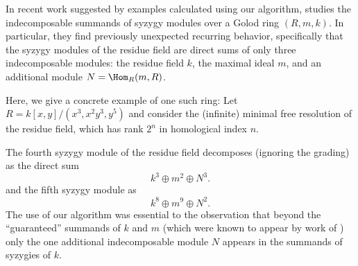 \documentclass[12pt]{article}
\numberwithin{equation}{section}
\theoremstyle{theorem}
\numberwithin{thm}{section}
\theoremstyle{definition}
\newcommand{\mahrud}[1]{{\color{ForestGreen} \sf $\blacklozenge$ Mahrud: [#1]}}
\begin{document}

\begin{exa}
  In recent work suggested by examples calculated using our algorithm, \cite{CDE24} studies the indecomposable summands of syzygy modules over a Golod ring $(R,m,k)$. In particular, they find previously unexpected recurring behavior, specifically that the syzygy modules of the residue field are direct sums of only three indecomposable modules: the residue field $k$, the maximal ideal $m$, and an additional module $N = \Hom_R(m, R)$.

  Here, we give a concrete example of one such ring:
  Let $R = k[x,y]/(x^3,x^2y^3,y^5)$ and consider the (infinite) minimal free resolution of the residue field, which has rank $2^n$ in homological index $n$.

  The fourth syzygy module of the residue field decomposes (ignoring the grading) as the direct sum
  $$ k^3 \oplus m^2 \oplus N^3. $$
  and the fifth syzygy module as
  $$ k^8\oplus m^9 \oplus N^2. $$
  The use of our algorithm was essential to the observation that beyond the ``guaranteed'' summands of $k$ and $m$ (which were known to appear by work of \cite{DE23}) only the one additional indecomposable module $N$ appears in the summands of syzygies of $k$.
\end{exa}
\end{document}
